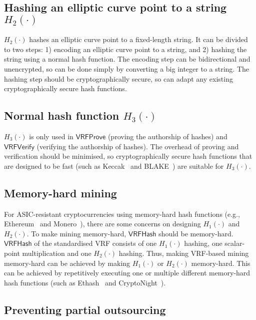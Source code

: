 \subsection{Hashing an elliptic curve point to a string $H_{2}(\cdot)$}

$H_{2}(\cdot)$ hashes an elliptic curve point to a fixed-length string.
It can be divided to two steps: 1) encoding an elliptic curve point to a string, and 2) hashing the string using a normal hash function.
The encoding step can be bidirectional and unencrypted, so can be done simply by converting a big integer to a string.
The hashing step should be cryptographically secure, so can adapt any existing cryptographically secure hash functions.


\subsection{Normal hash function $H_{3}(\cdot)$}

$H_{3}(\cdot)$ is only used in $\mathsf{VRFProve}$ (proving the authorship of hashes) and $\mathsf{VRFVerify}$ (verifying the authorship of hashes).
The overhead of proving and verification should be minimised, so cryptographically secure hash functions that are designed to be fast (such as Keccak~\cite{bertoni2013keccak} and BLAKE~\cite{aumasson2008sha}) are suitable for $H_{3}(\cdot)$.

\subsection{Memory-hard mining}

For ASIC-resistant cryptocurrencies using memory-hard hash functions (e.g., Ethereum~\cite{wood2014ethereum} and Monero~\cite{monero}), there are some concerns on designing $H_{1}(\cdot)$ and $H_{2}(\cdot)$.
To make mining memory-hard, $\mathsf{VRFHash}$ should be memory-hard.
$\mathsf{VRFHash}$ of the standardised VRF consists of one $H_{1}(\cdot)$ hashing, one scalar-point multiplication and one $H_{2}(\cdot)$ hashing.
Thus, making VRF-based mining memory-hard can be achieved by making $H_{1}(\cdot)$ or $H_{2}(\cdot)$ memory-hard.
This can be achieved by repetitively executing one or multiple different memory-hard hash functions (such as Ethash~\cite{wiki2017ethash} and CryptoNight~\cite{seigenneocortex}).



\subsection{Preventing partial outsourcing}


